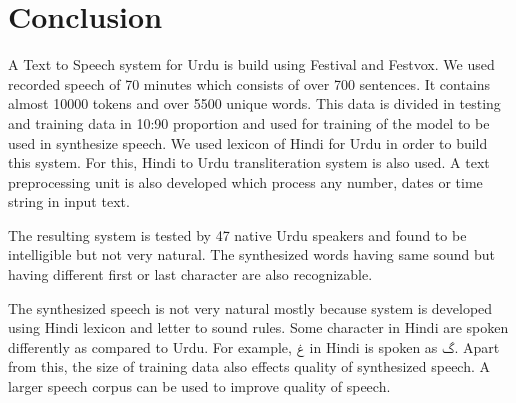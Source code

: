 \chapter{Conclusion}

A Text to Speech system for Urdu is build using Festival and Festvox. We used recorded speech of 70 minutes which consists of over 700 sentences. It contains almost 10000 tokens and over 5500 unique words. This data is divided in testing and training data in 10:90 proportion and used for training of the model to be used in synthesize speech. We used lexicon of Hindi for Urdu in order to build this system. For this, Hindi to Urdu transliteration system is also used. A text preprocessing unit is also developed which process any number, dates or time string in input text. 

The resulting system is tested by 47 native Urdu speakers and found to be intelligible but not very natural. The synthesized words having same sound but having different first or last character are also recognizable. 

The synthesized speech is not very natural mostly because system is developed using Hindi lexicon and letter to sound rules. Some character in Hindi are spoken differently as compared to Urdu. For example, \texturdu{‫غ‬} in Hindi is spoken as \texturdu{گ}. Apart from this, the size of training data also effects quality of synthesized speech. A larger speech corpus can be used to improve quality of speech.

